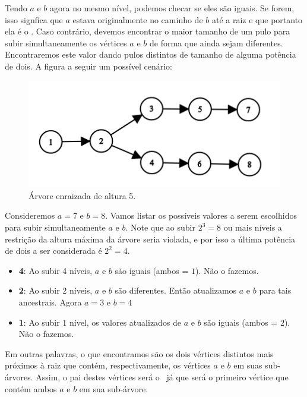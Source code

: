 Tendo $a$ e $b$ agora no mesmo nível, podemos checar se eles são iguais. Se forem, isso signfica que $a$ estava originalmente no caminho de $b$ até a raiz e que portanto ela é o \LCA. Caso contrário, devemos encontrar o maior tamanho de um pulo para subir simultaneamente os vértices $a$ e $b$ de forma que ainda sejam diferentes. Encontraremos este valor dando pulos distintos de tamanho de alguma potência de dois. A figura a seguir um possível cenário:

\begin{figure}[htb]
\begin{center}
\includegraphics{images/graph_dp2.png}
\end{center}
\caption{\label{fig:arvore-5}Árvore enraizada de altura 5.}
\end{figure}


Consideremos $a = 7$ e $b = 8$. Vamos listar os possíveis valores a serem escolhidos para subir simultaneamente $a$ e $b$. Note que ao subir $2^3 = 8$ ou mais níveis a restrição da altura máxima da árvore seria violada, e por isso a última potência de dois a ser considerada é $2^2 = 4$.

\begin{itemize}
    \item \textbf{4}: Ao subir 4 níveis, $a$ e $b$ são iguais (ambos = $1$). Não o fazemos.
    \item \textbf{2}: Ao subir 2 níveis, $a$ e $b$ são diferentes. Então atualizamos $a$ e $b$ para tais ancestrais. Agora $a = 3$ e $b = 4$
    \item \textbf{1}: Ao subir 1 nível, os valores atualizados de $a$ e $b$ são iguais (ambos = $2$). Não o fazemos.
\end{itemize}

Em outras palavras, o que encontramos são os dois vértices distintos mais próximos à raiz que contém, respectivamente, os vértices $a$ e $b$ em suas sub-árvores. Assim, o pai destes vértices será o \LCA\, já que será o primeiro vértice que contém ambos $a$ e $b$ em sua sub-árvore.

